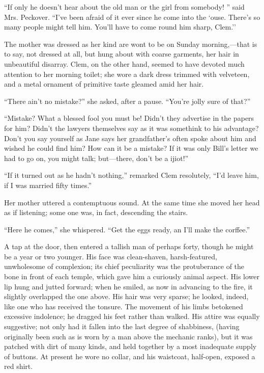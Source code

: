 ``If only he doesn't hear about the old man or the girl from somebody!
'' said Mrs. Peckover. ``I've been afraid of it ever since he come into
the `ouse. There's so many people might tell him. You'll have to come
round him sharp, Clem.''

The mother was dressed as her kind are wont to be on Sunday
morning,---that is to say, not dressed at all, but hung about with
coarse garments, her hair in unbeautiful disarray. Clem, on the other
hand, seemed to have devoted much attention to her morning toilet; she
wore a dark dress trimmed with {\protect\hypertarget{4}{}{}}velveteen,
and a metal ornament of primitive taste gleamed amid her hair.

``There ain't no mistake?'' she asked, after a pause. ``You're jolly
sure of that?''

``Mistake? What a blessed fool you must be! Didn't they advertise in the
papers for him? Didn't the lawyers themselves say as it was somethink to
his advantage? Don't you say yourself as Jane says her grandfather's
often spoke about him and wished he could find him? How can it be a
mistake? If it was only Bill's letter we had to go on, you might talk;
but---there, don't be a ijiot!''

``If it turned out as he hadn't nothing,'' remarked Clem resolutely,
``I'd leave him, if I was married fifty times.''

Her mother uttered a contemptuous sound. At the same time she moved her
head as if listening; some one was, in fact, descending the stairs.

``Here he comes,'' she whispered. ``Get the eggs ready, an I'll make the
corffee.''

A tap at the door, then entered a tallish
{\protect\hypertarget{5}{}{}}man of perhaps forty, though he might be a
year or two younger. His face was clean-shaven, harsh-featured,
unwholesome of complexion; its chief peculiarity was the protuberance of
the bone in front of each temple, which gave him a curiously animal
aspect. His lower lip hung and jutted forward; when he smiled, as now in
advancing to the fire, it slightly overlapped the one above. His hair
was very sparse; he looked, indeed, like one who has received the
tonsure. The movement of his limbs betokened excessive indolence; he
dragged his feet rather than walked. His attire was equally suggestive;
not only had it fallen into the last degree of shabbiness, (having
originally been such as is worn by a man above the mechanic ranks), but
it was patched with dirt of many kinds, and held together by a most
inadequate supply of buttons. At present he wore no collar, and his
waistcoat, half-open, exposed a red shirt.

